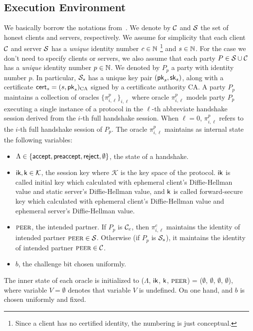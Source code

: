 \subsection{Execution Environment} \label{sec:exec_env_party}
We basically borrow the notations
from~\cite{JKSS12:ACCE,KPW13:SACCE}.
We denote by $\mathcal{C}$ and $\mathcal{S}$ the set of honest
clients and servers, respectively.
We assume for simplicity that each client $\mathcal{C}$
and server $\mathcal{S}$ has a \textit{unique} identity
number $c \in \mathbb{N}$
\footnote{Since a client has no certified identity,
the numbering is just conceptual.}
and $s \in \mathbb{N}$.
For the case we don't need to specify clients or
servers, we also assume that each party
$P \in \mathcal{S} \cup \mathcal{C}$ has a \textit{unique}
identity number $p \in \mathbb{N}$.
We denoted by $P_p$ a party with identity number $p$.
In particular, $\mathcal{S}_s$ has a unique key pair
$(\mathsf{pk}_s, \mathsf{sk}_s)$, along with a certificate
$\mathsf{cert}_s=(s,\mathsf{pk}_s)_{\text{CA}}$ signed by a certificate
authority CA.
A party $P_p$ maintains a collection of oracles
$\{\pi^p_{i,\ell }\}_{i,\ell}$ where oracle
$\pi^p_{i, \ell}$ models party $P_p$ executing a single
instance of a protocol in the $\ell$-th abbreviate
handshake session derived from  the $i$-th full
handshake session.
When $\ell=0$, $\pi^p_{i,\ell}$ refers to the $i$-th
full handshake session of $P_p$.
The oracle $\pi^p_{i, \ell}$ maintains as internal
state the following variables:

\begin{itemize}
 \item{$\Lambda \in \{\mathsf{accept}, \mathsf{preaccept}, \mathsf{reject},
 \emptyset\}$, the state of a handshake.}

 \item{$\mathsf{ik}, \mathsf{k} \in \mathcal{K}$, the session key
 where $\mathcal{K}$ is the key space of the protocol.
 $\mathsf{ik}$ is called initial key which calculated with
 ephemeral client's Diffie-Hellman value and static
 server's Diffie-Hellman value, and $\mathsf{k}$ is called
 forward-secure key which calculated with ephemeral
 client's Diffie-Hellman value and ephemeral server's
 Diffie-Hellman value.}

 \item{$\textsc{peer}$, the intended partner. If $P_p$ is
 $\mathcal{C}_c$, then $\pi^c_{i,\ell}$ maintains the
 identity of intended partner $\textsc{peer} \in \mathcal{S}$.
 Otherwise (if $P_p$ is $\mathcal{S}_s$), it maintains
 the identity of intended partner $\textsc{peer} \in \mathcal{C}$.}

 \item{$b$, the challenge bit chosen uniformly.}
\end{itemize}
The inner state of each oracle is initialized to
($\Lambda$, $\mathsf{ik}$, $\mathsf{k}$, $\textsc{peer}$) = ($\emptyset$,
$\emptyset$, $\emptyset$, $\emptyset$), where
variable $V=\emptyset$ denotes that variable $V$
is undefined.
On one hand, and $b$ is chosen uniformly and fixed.

